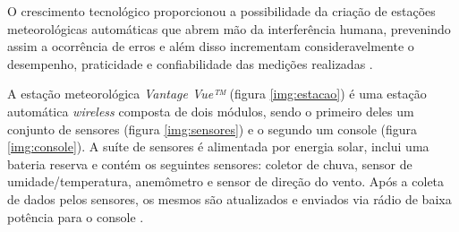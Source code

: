 O crescimento tecnológico proporcionou a possibilidade da criação de estações meteorológicas automáticas que abrem mão da interferência humana, prevenindo assim a ocorrência de erros e além disso incrementam consideravelmente o desempenho, praticidade e confiabilidade das medições realizadas \cite{torres2015aquisicao}.  

A estação meteorológica \textit{Vantage Vue™} (figura \ref{img:estacao}) é uma estação automática \textit{wireless} composta de dois módulos, sendo o primeiro deles um conjunto de sensores (figura \ref{img:sensores}) e o segundo um console (figura \ref{img:console}). A suíte de sensores é alimentada por energia solar, inclui uma bateria reserva e contém os seguintes sensores: coletor de chuva, sensor de umidade/temperatura, anemômetro e sensor de direção do vento. Após a coleta de dados pelos sensores, os mesmos são atualizados e enviados via rádio de baixa potência para o console \cite{SITEDAVIS, VVINSTMANUAL}.

\newpage

